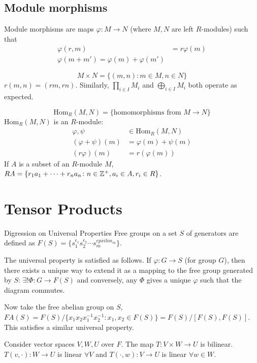 \documentclass[a4paper,twoside,master.tex]{subfiles}
\begin{document}
\subsection{Module morphisms}\label{sub:module_morphisms}

Module morphisms are maps $ \varphi \colon M \to N $ (where $ M,N $ are left $ R $-modules) such that
\begin{align}
    \varphi(r,m) &= r \varphi(m) \\
    \varphi(m+m') = \varphi(m) + \varphi(m')
\end{align}

\begin{equation}
    M \times N = \{(m,n)\colon m \in M, n \in N\}
\end{equation}
$ r(m,n) = (rm,rn) $. Similarly, $ \prod_{i \in I} M_i $ and $ \bigoplus_{i \in I} M_i $ both operate as expected.

\begin{equation}
    \text{Hom}_R(M,N) = \{\text{homomorphisms from } M \to N \}
\end{equation}
$ \text{Hom}_R(M,N) $ is an $ R $-module:
\begin{align}
    \varphi, \psi &\in \text{Hom}_R(M,N) \\
    (\varphi + \psi)(m) &= \varphi(m) + \psi(m) \\
    (r \varphi)(m) &= r(\varphi(m))
\end{align}
If $ A $ is a subset of an $ R $-module $ M $, $ RA = \{r_1 a_1 + \cdots + r_n a_n \colon n \in \mathbb{Z}^+, a_i \in A, r_i \in R\} $.

\section{Tensor Products}\label{sec:tensor_products}

\begin{note}{Digression on Universal Properties}
    Free groups on a set $ S $ of generators are defined as $ F(S) = \{s_1^{\epsilon_1} s_2^{\epsilon_2} \cdots s_m^{epxilon_m}\} $.

    The universal property is satisfied as follows. If $ \varphi \colon G \to S $ (for group $ G $), then there exists a unique way to extend it as a mapping to the free group generated by $ S $: $ \exists! \Phi \colon G \to F(S) $ and conversely, any $ \Phi $ gives a unique $ \varphi $ such that the diagram commutes.

    Now take the free abelian group on $ S $, $ FA(S) = F(S)/ \{x_1 x_2 x_1^{-1} x_2^{-1} \colon x_1, x_2 \in F(S)\} = F(S)/[F(S),F(S)] $. This satisfies a similar universal property.

\end{note}


Consider vector spaces $ V,W,U $ over $ F $. The map $ T\colon V \times W \to U $ is bilinear. $ T(v, \cdot) \colon W \to U $ is linear $ \forall V $ and $ T(\cdot, w) \colon V \to U $ is linear $ \forall w \in W $.
\end{document}
